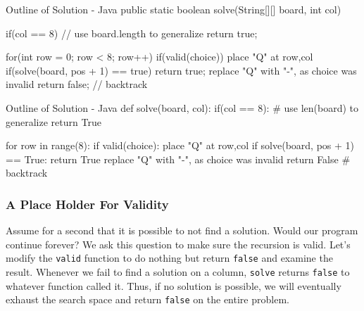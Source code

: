 \begin{javacode}[listing and comment, comment={The initial call to solve will pass in \texttt{0} for \texttt{col} to start at the first column. We use \texttt{col == 8} as the base case, as a call to \texttt{solve(board, 8)} would be trying to check a column that does not exist.  The only way for that to happen is from a call on the  8th column (index 7), which means that that last column has found a working solution. If we want to generalize this solution to work on square boards other that a standard 8x8 chess board, we can do that by replacing all the 8's in the code with \texttt{board.length}.}]{Outline of Solution - Java}
public static boolean solve(String[][] board, int col){
	if(col == 8) { // use board.length to generalize
		return true;
	}
	
	for(int row = 0; row < 8; row++) {
		if(valid(choice)){
			place "Q" at row,col
			if(solve(board, pos + 1) == true){
				return true;
			}
			replace "Q" with "-", as choice was invalid
		}
	}
	return false; // backtrack
}
\end{javacode}


\begin{pycode}[listing and comment, comment={The initial call to solve will pass in \texttt{0} for \texttt{col} to start at the first column. We use \texttt{col == 8} as the base case, as a call to \texttt{solve(board, 8)} would be trying to check a column that does not exist.  The only way for that to happen is from a call on the  8th column (index 7), which means that that last column has found a working solution. If we want to generalize this solution to work on square boards other that a standard 8x8 chess board, we can do that by replacing all the 8's in the code with \texttt{len(board).}}]{Outline of Solution - Java}
def solve(board, col):
	if(col == 8): # use len(board) to generalize
		return True
		
	for row in range(8):
		if valid(choice):
			place "Q" at row,col
			if solve(board, pos + 1) == True:
				return True
			replace "Q" with "-", as choice was invalid
	return False # backtrack
\end{pycode}

\subsubsection{A Place Holder For Validity}

Assume for a second that it is possible to not find a solution.  Would our program continue forever?  We ask this question to make sure the recursion is valid. Let's modify the \texttt{valid} function to do nothing but return \texttt{false} and examine the result.  Whenever we fail to find a solution on a column, \texttt{solve} returns \texttt{false} to whatever function called it.  Thus, if no solution is possible, we will eventually exhaust the search space and return \texttt{false} on the entire problem.

